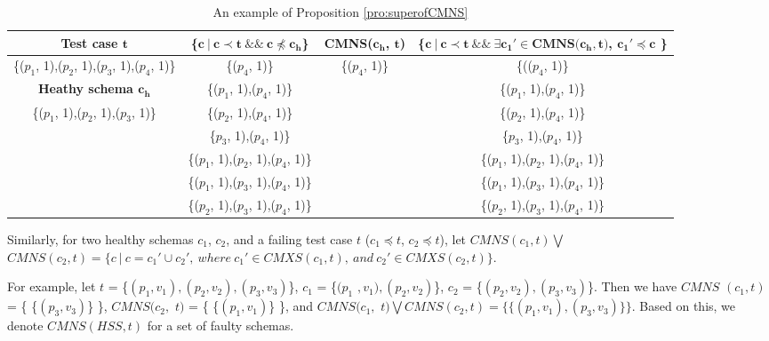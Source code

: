 {%
\begin{table}[ht]
  \centering
  \setlength{\tabcolsep}{2pt}
  \caption{An example of Proposition \ref{pro:superofCMNS}}
  {\footnotesize
    \begin{tabular}{|c|c|c|c|}
    \hline
  \textbf{  Test case $\textbf{t}$} & \textbf{ \{$\textbf{c}\ |\ \textbf{c} \prec \textbf{t}\ \&\&\ \textbf{c} \npreceq \textbf{c}_{\textbf{h}}$\} }& \textbf{ CMNS($\textbf{c}_{\textbf{h}}$, $\textbf{t}$)} & \textbf{\{$ \textbf{c}\ |\ \textbf{c} \prec \textbf{t} \ \&\& \ \exists \textbf{c}_{\textbf{1}}' \in \textbf{CMNS}\textbf{(}\textbf{c}_{\textbf{h}}, \textbf{t}\textbf{)}$, $  \textbf{c}_{\textbf{1}}' \preceq \textbf{c}$ \}}\\\hline
    \{($p_{1}$, 1),($p_{2}$, 1),($p_{3}$, 1),($p_{4}$, 1)\}  & \{($p_{4}$, 1)\} & \{($p_{4}$, 1)\} & \{(($p_{4}$, 1)\}\\ \cline{1-1}
      \textbf{Heathy schema $\textbf{c}_{\textbf{h}}$}  & \{($p_{1}$, 1),($p_{4}$, 1)\} &  & \{($p_{1}$, 1),($p_{4}$, 1)\} \\\cline{1-1}
     \{($p_{1}$, 1),($p_{2}$, 1),($p_{3}$, 1)\}         &\{($p_{2}$, 1),($p_{4}$, 1)\}  &  & \{($p_{2}$, 1),($p_{4}$, 1)\}  \\
                         &\{$p_{3}$, 1),($p_{4}$, 1)\}   &  & \{$p_{3}$, 1),($p_{4}$, 1)\}  \\
                         &\{($p_{1}$, 1),($p_{2}$, 1),($p_{4}$, 1)\}   &  & \{($p_{1}$, 1),($p_{2}$, 1),($p_{4}$, 1)\}  \\
                         &\{($p_{1}$, 1),($p_{3}$, 1),($p_{4}$, 1)\}  &  & \{($p_{1}$, 1),($p_{3}$, 1),($p_{4}$, 1)\}  \\
                         &\{($p_{2}$, 1),($p_{3}$, 1),($p_{4}$, 1)\}  &  & \{($p_{2}$, 1),($p_{3}$, 1),($p_{4}$, 1)\}  \\ \hline
    \end{tabular}}%
  \label{examleOfCMNSPro}%
\end{table}%


Similarly, for two healthy schemas $c_{1}$, $c_{2}$, and a failing test case $t$ ($c_{1} \preceq t$, $c_{2} \preceq t$), let $CMNS(c_{1}, t) \bigvee $ $CMNS(c_{2}, t)  = \{ c\ |\ c = c_{1}' \cup c_{2}',\ where\ c_{1}' \in CMXS(c_{1}, t),\ and\ c_{2}' \in CMXS(c_{2}, t) \}$.

For example, let $t$ = \{$(p_{1},v_{1}), (p_{2}, v_{2}), (p_{3}, v_{3})$\}, $c_{1}$ = \{$(p_{1}$ $, v_{1}), (p_{2}, v_{2})$\}, $c_{2}$ = \{$(p_{2}, v_{2}), (p_{3}, v_{3})$\}. Then we have $CMNS$ $(c_{1}, t)$ = \{ \{$(p_{3}, v_{3})$\} \}, $CMNS(c_{2},$ $ t)$ = \{ \{$(p_{1}, v_{1})$\} \}, and  $CMNS(c_{1},$ $ t) \bigvee CMNS(c_{2}, t) = \{ \{(p_{1}, v_{1}), (p_{3}, v_{3})\} \} $. Based on this, we denote $CMNS(HSS,t)$ for a set of faulty schemas.


}
